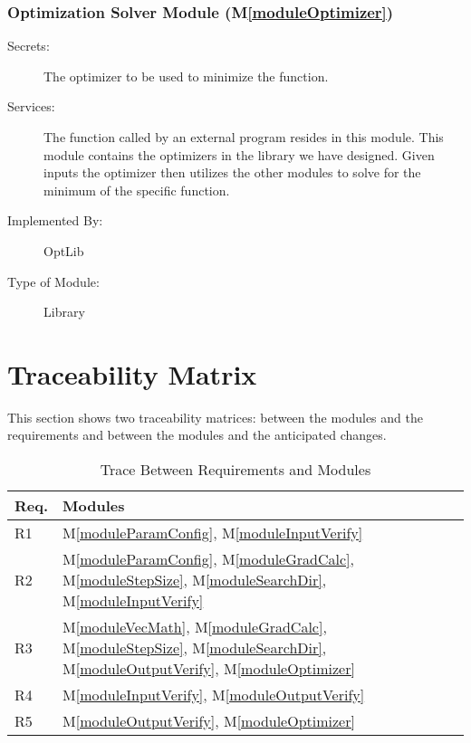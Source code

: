 \documentclass[12pt, titlepage]{article}
\newcommand{\mref}[1]{M\ref{#1}}
\begin{document}
\subsubsection{Optimization Solver Module (\mref{moduleOptimizer})}

\begin{description}
\item[Secrets:]The optimizer to be used to minimize the function.
\item[Services:]The function called by an external program resides in this module. This module contains the optimizers in the library we have designed. Given inputs the optimizer then utilizes the other modules to solve for the minimum of the specific function.
\item[Implemented By:] OptLib
\item[Type of Module:] Library
\end{description}

\section{Traceability Matrix} \label{SecTM}

This section shows two traceability matrices: between the modules and the
requirements and between the modules and the anticipated changes.

\begin{table}[H]
\centering
\begin{tabular}{p{} p{}}
\toprule
\textbf{Req.} & \textbf{Modules}\\
\midrule
R1 & \mref{moduleParamConfig}, \mref{moduleInputVerify} \\
R2 & \mref{moduleParamConfig}, \mref{moduleGradCalc}, \mref{moduleStepSize}, \mref{moduleSearchDir}, \mref{moduleInputVerify}\\
R3 & \mref{moduleVecMath}, \mref{moduleGradCalc}, \mref{moduleStepSize}, \mref{moduleSearchDir}, \mref{moduleOutputVerify},  \mref{moduleOptimizer}\\
R4 & \mref{moduleInputVerify}, \mref{moduleOutputVerify}\\
R5 & \mref{moduleOutputVerify}, \mref{moduleOptimizer}\\
\bottomrule
\end{tabular}
\caption{Trace Between Requirements and Modules}
\label{TblRT}
\end{table}
\end{document}
